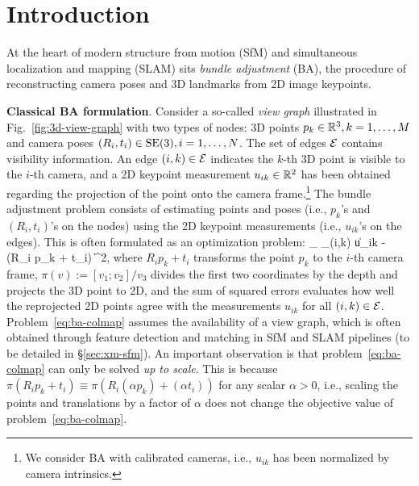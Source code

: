 
\section{Introduction}
\label{sec:introduction}

At the heart of modern structure from motion (SfM) and simultaneous localization and mapping (SLAM) sits \emph{bundle adjustment} (BA), the procedure of reconstructing camera poses and 3D landmarks from 2D image keypoints.

\textbf{Classical BA formulation}. Consider a so-called \emph{view graph} illustrated in Fig.~\ref{fig:3d-view-graph} with two types of nodes: 3D points $p_k \in { {\mathbb R}^{3} }, k=1,\dots,M$ and camera poses $(R_i, t_i) \in \mathrm{SE}(3),i=1,\dots,N$. The set of edges ${\cal E}$ contains visibility information. An edge $(i,k) \in {\cal E}$ indicates the $k$-th 3D point is visible to the $i$-th camera, and a 2D keypoint measurement $u_{ik} \in { {\mathbb R}^{2} }$ has been obtained regarding the projection of the point onto the camera frame.\footnote{
    We consider BA with calibrated cameras, i.e., $u_{ik}$ has been normalized by camera intrinsics.
} 
The bundle adjustment problem consists of estimating points and poses (i.e., $p_k$'s and $(R_i, t_i)$'s on the nodes) using the 2D keypoint measurements (i.e., $u_{ik}$'s on the edges). This is often formulated as an optimization problem:
\bea\label{eq:ba-colmap}
\min_{ } \sum_{(i,k)\in \calE} \left\| u_{ik} - \pi(R_i p_k + t_i) \right\|^2,
\eea
where $R_i p_k + t_i$ transforms the point $p_k$ to the $i$-th camera frame, $\pi(v):= [v_1 ; v_2]/v_3$ divides the first two coordinates by the depth and projects the 3D point to 2D, and the sum of squared errors evaluates how well the reprojected 2D points agree with the measurements $u_{ik}$ for all $(i,k) \in {\cal E}$. Problem~\eqref{eq:ba-colmap} assumes the availability of a view graph, which is often obtained through feature detection and matching in SfM and SLAM pipelines (to be detailed in \S\ref{sec:xm-sfm}). An important observation is that problem~\eqref{eq:ba-colmap} can only be solved \emph{up to scale}. This is because $\pi(R_i p_k + t_i) \equiv \pi(R_i (\alpha p_k) + (\alpha t_i))$ for any scalar $\alpha > 0$, i.e., scaling the points and translations by a factor of $\alpha$ does not change the objective value of problem~\eqref{eq:ba-colmap}. 

